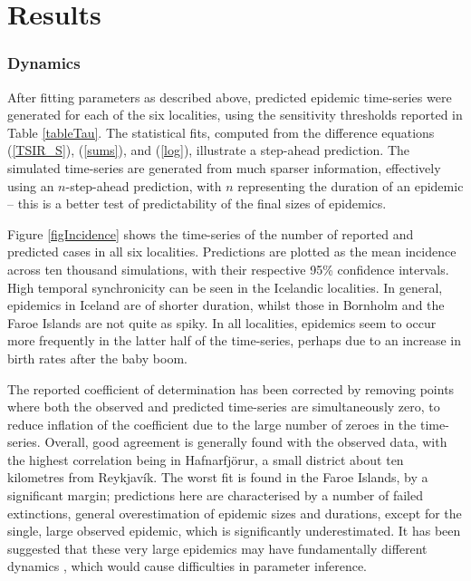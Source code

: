 \documentclass[10pt]{article}
\begin{document}
\section*{Results}

\subsubsection*{Dynamics}

After fitting parameters as described above, predicted epidemic time-series were generated for each of the six localities, using the sensitivity thresholds reported in Table \ref{tableTau}. The statistical fits, computed from the difference equations (\ref{TSIR_S}), (\ref{sums}), and (\ref{log}), illustrate a step-ahead prediction. The simulated time-series are generated from much sparser information, effectively using an $n$-step-ahead prediction, with $n$ representing the duration of an epidemic -- this is a better test of predictability of the final sizes of epidemics.

Figure \ref{figIncidence} shows the time-series of the number of reported and predicted cases in all six localities. Predictions are plotted as the mean incidence across ten thousand simulations, with their respective 95\% confidence intervals. High temporal synchronicity can be seen in the Icelandic localities. In general, epidemics in Iceland are of shorter duration, whilst those in Bornholm and the Faroe Islands are not quite as spiky. In all localities, epidemics seem to occur more frequently in the latter half of the time-series, perhaps due to an increase in birth rates after the baby boom. 

The reported coefficient of determination has been corrected by removing points where both the observed and predicted time-series are simultaneously zero, to reduce inflation of the coefficient due to the large number of zeroes in the time-series. Overall, good agreement is generally found with the observed data, with the highest correlation being in Hafnarfj\"{o}r\dh{}ur, a small district about ten kilometres from Reykjav\'{i}k. The worst fit is found in the Faroe Islands, by a significant margin; predictions here are characterised by a number of failed extinctions, general overestimation of epidemic sizes and durations, except for the single, large observed epidemic, which is significantly underestimated. It has been suggested that these very large epidemics may have fundamentally different dynamics \cite{Rhodes1996}, which would cause difficulties in parameter inference.
\end{document}
